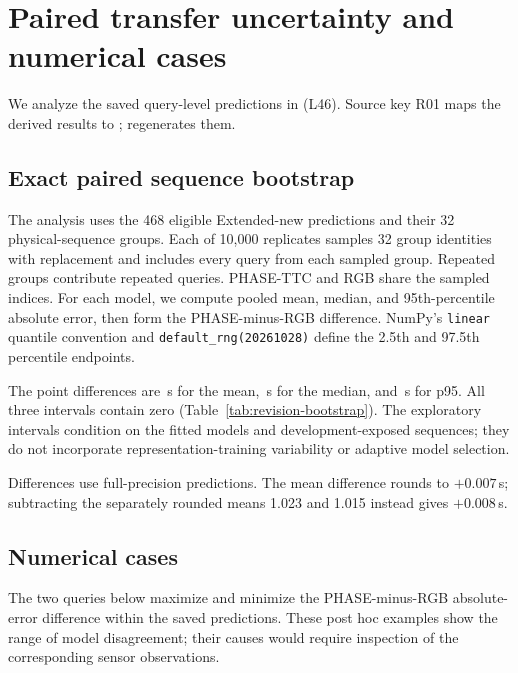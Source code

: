 \clearpage
\section{Paired transfer uncertainty and numerical cases}
\label{app:derived-transfer}
We analyze the saved query-level predictions in  (L46). Source key R01 maps the derived results to ;  regenerates them.

\subsection{Exact paired sequence bootstrap}
The analysis uses the 468 eligible Extended-new predictions and their 32 physical-sequence groups. Each of 10,000 replicates samples 32 group identities with replacement and includes every query from each sampled group. Repeated groups contribute repeated queries. PHASE-TTC and RGB share the sampled indices. For each model, we compute pooled mean, median, and 95th-percentile absolute error, then form the PHASE-minus-RGB difference. NumPy's \texttt{linear} quantile convention and \texttt{default\_rng(20261028)} define the 2.5th and 97.5th percentile endpoints.

The point differences are \RevisionMeanDelta\,s for the mean, \RevisionMedianDelta\,s for the median, and \RevisionPninetyfiveDelta\,s for p95. All three intervals contain zero (Table~\ref{tab:revision-bootstrap}). The exploratory intervals condition on the fitted models and development-exposed sequences; they do not incorporate representation-training variability or adaptive model selection.

Differences use full-precision predictions. The mean difference rounds to $+0.007$\,s; subtracting the separately rounded means 1.023 and 1.015 instead gives $+0.008$\,s.

\subsection{Numerical cases}
The two queries below maximize and minimize the PHASE-minus-RGB absolute-error difference within the saved predictions. These post hoc examples show the range of model disagreement; their causes would require inspection of the corresponding sensor observations.

\FloatBarrier

\clearpage
